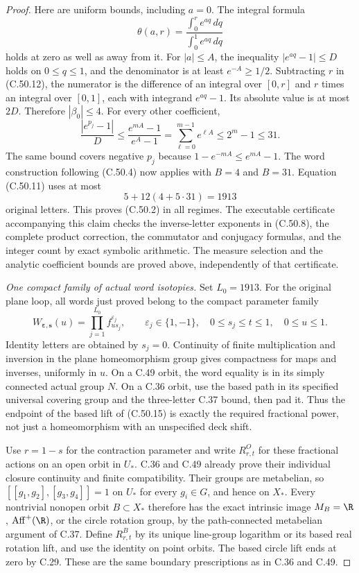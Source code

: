 \begin{proof}
Here are uniform bounds, including $a=0$.
The integral formula
\[
        \theta(a,r)=
          \frac{\int_0^r e^{a q}\,dq}
               {\int_0^1 e^{a q}\,dq}                  \tag{C.50.12}
\]
holds at zero as well as away from it.
For $|a|\leq A$, the inequality
$|e^{aq}-1|\leq D$ holds on $0\leq q\leq1$, and the
denominator is at least $e^{-A}\geq1/2$.
Subtracting $r$ in (C.50.12), the numerator is the
difference of an integral over $[0,r]$ and $r$ times
an integral over $[0,1]$, each with integrand
$e^{aq}-1$. Its absolute value is at most $2D$.
Therefore $|\beta_0|\leq4$.
For every other coefficient,
\[
 \frac{|e^{p_j}-1|}{D}
 \leq\frac{e^{mA}-1}{e^A-1}
   =\sum_{\ell=0}^{m-1}e^{\ell A}
   \leq 2^m-1\leq31.                                  \tag{C.50.13}
\]
The same bound covers negative $p_j$ because
$1-e^{-mA}\leq e^{mA}-1$.
The word construction following (C.50.4) now applies with
$B=4$ and $B=31$. Equation (C.50.11) uses at most
\[
                      5+12(4+5\cdot31)=1913             \tag{C.50.14}
\]
original letters. This proves (C.50.2) in all regimes.
The executable certificate accompanying this claim checks
the inverse-letter exponents in (C.50.8), the complete
product correction, the commutator and conjugacy formulas,
and the integer count by exact symbolic arithmetic.
The measure selection and the analytic coefficient bounds
are proved above, independently of that certificate.

\emph{One compact family of actual word isotopies.}
Set $L_0=1913$.
For the original plane loop, all words just proved belong
to the compact parameter family
\[
 W_{\boldsymbol\varepsilon,\boldsymbol s}(u)
       =\prod_{j=1}^{L_0}f_{u s_j}^{\varepsilon_j},
 \qquad
 \varepsilon_j\in\{1,-1\},\quad
 0\leq s_j\leq t\leq1,\quad0\leq u\leq1.
                                                        \tag{C.50.15}
\]
Identity letters are obtained by $s_j=0$.
Continuity of finite multiplication and inversion in the
plane homeomorphism group gives compactness for maps and
inverses, uniformly in $u$.
On a C.49 orbit, the word equality is in its simply
connected actual group $N$.
On a C.36 orbit, use the based path in its specified
universal covering group and the three-letter C.37 bound,
then pad it. Thus the endpoint of the based lift of
(C.50.15) is exactly the required fractional power,
not just a homeomorphism with an unspecified deck shift.

Use $r=1-s$ for the contraction parameter and write
$R^O_{r,t}$ for these fractional actions on an open
orbit in $U_*$. C.36 and C.49 already prove their
individual closure continuity and finite compatibility.
Their groups are metabelian, so
$[[g_1,g_2],[g_3,g_4]]=1$ on $U_*$ for every
$g_i\in G$, and hence on $X_*$.
Every nontrivial nonopen orbit $B\subset X_*$ therefore
has the exact intrinsic image
$M_B=\R$, $\operatorname{Aff}^+(\R)$, or the circle
rotation group, by the path-connected metabelian
argument of C.37.
Define $R^B_{r,t}$ by its unique line-group logarithm
or its based real rotation lift, and use the identity
on point orbits. The based circle lift ends at zero
by C.29. These are the same boundary prescriptions
as in C.36 and C.49.


\end{proof}
